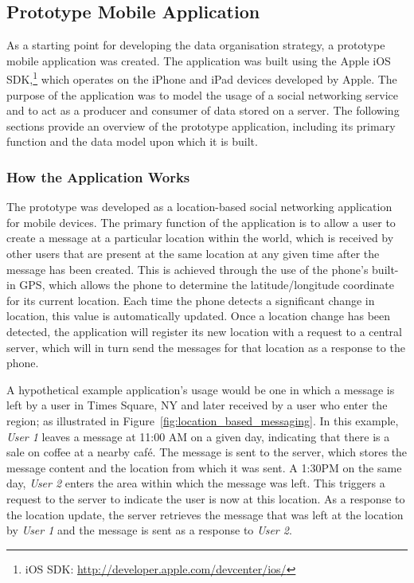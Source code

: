 \documentclass{article}
\begin{document}
\subsection{Prototype Mobile Application} %
\label{sub:prototype_mobile_application}

As a starting point for developing the data organisation strategy, a prototype mobile application was created. The application was built using the Apple iOS SDK,\footnote{iOS SDK: \url{http://developer.apple.com/devcenter/ios/}} which operates on the iPhone and iPad devices developed by Apple. The purpose of the application was to model the usage of a social networking service and to act as a producer and consumer of data stored on a server. The following sections provide an overview of the prototype application, including its primary function and the data model upon which it is built.

\subsubsection{How the Application Works} %
\label{ssub:how_the_application_works}

The prototype was developed as a location-based social networking application for mobile devices. The primary function of the application is to allow a user to create a message at a particular location within the world, which is received by other users that are present at the same location at any given time after the message has been created. This is achieved through the use of the phone's built-in GPS, which allows the phone to determine the latitude/longitude coordinate for its current location. Each time the phone detects a significant change in location, this value is automatically updated. Once a location change has been detected, the application will register its new location with a request to a central server, which will in turn send the messages for that location as a response to the phone.

A hypothetical example application's usage would be one in which a message is left by a user in Times Square, NY and later received by a user who enter the region; as illustrated in Figure~\ref{fig:location_based_messaging}. In this example, \emph{User 1} leaves a message at 11:00 AM on a given day, indicating that there is a sale on coffee at a nearby caf\'e. The message is sent to the server, which stores the message content and the location from which it was sent. A 1:30PM on the same day, \emph{User 2} enters the area within which the message was left. This triggers a request to the server to indicate the user is now at this location. As a response to the location update, the server retrieves the message that was left at the location by \emph{User 1} and the message is sent as a response to \emph{User 2}.
\end{document}
